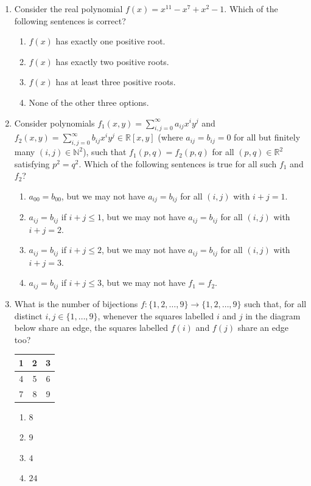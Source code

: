 \documentclass[11pt, a4paper]{article}
\begin{document}
\begin{enumerate}
  \item Consider the real polynomial $f(x) = x^{11} - x^7 + x^2 - 1$. Which of the following sentences is correct?
  \begin{enumerate}[label=(\alph*)]
    \item $f(x)$ has exactly one positive root.
    \item $f(x)$ has exactly two positive roots.
    \item $f(x)$ has at least three positive roots.
    \item None of the other three options.
  \end{enumerate}

  \item Consider polynomials $f_1(x, y) = \sum_{i,j=0}^\infty a_{ij} x^i y^j$ and $f_2(x, y) = \sum_{i,j=0}^\infty b_{ij} x^i y^j \in \mathbb{R}[x, y]$ (where $a_{ij} = b_{ij} = 0$ for all but finitely many $(i, j) \in \mathbb{N}^2$), such that $f_1(p, q) = f_2(p, q)$ for all $(p, q) \in \mathbb{R}^2$ satisfying $p^2 = q^2$. Which of the following sentences is true for all such $f_1$ and $f_2$?
  \begin{enumerate}[label=(\alph*)]
    \item $a_{00} = b_{00}$, but we may not have $a_{ij} = b_{ij}$ for all $(i, j)$ with $i + j = 1$.
    \item $a_{ij} = b_{ij}$ if $i + j \le 1$, but we may not have $a_{ij} = b_{ij}$ for all $(i, j)$ with $i + j = 2$.
    \item $a_{ij} = b_{ij}$ if $i + j \le 2$, but we may not have $a_{ij} = b_{ij}$ for all $(i, j)$ with $i + j = 3$.
    \item $a_{ij} = b_{ij}$ if $i + j \le 3$, but we may not have $f_1 = f_2$.
  \end{enumerate}

  \item What is the number of bijections $f: \{1, 2, \dots, 9\} \to \{1, 2, \dots, 9\}$ such that, for all distinct $i, j \in \{1, \dots, 9\}$, whenever the squares labelled $i$ and $j$ in the diagram below share an edge, the squares labelled $f(i)$ and $f(j)$ share an edge too?
  \begin{center}
    \begin{tabular}{|c|c|c|}
      \hline
      1 & 2 & 3 \\ \hline
      4 & 5 & 6 \\ \hline
      7 & 8 & 9 \\ \hline
    \end{tabular}
  \end{center}
  \begin{enumerate}[label=(\alph*)]
    \item $8$
    \item $9$
    \item $4$
    \item $24$
  \end{enumerate}


\end{enumerate}
\end{document}
